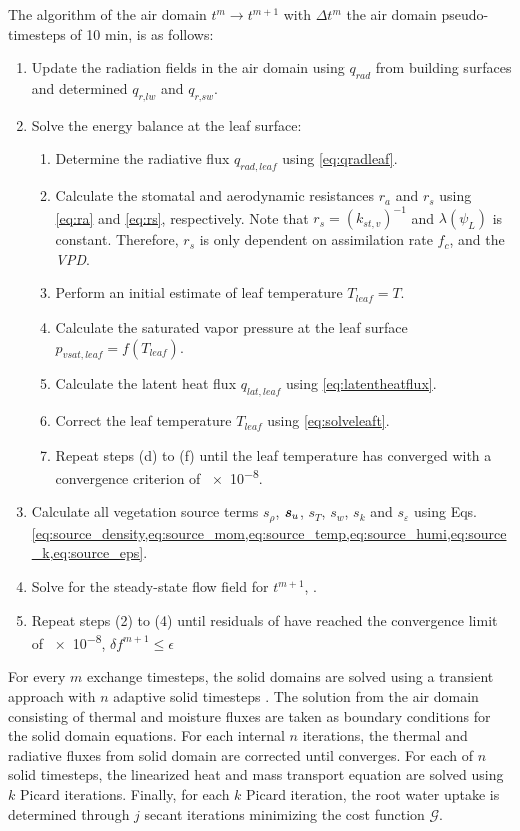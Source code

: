 The algorithm of the air domain $t^{m}\rightarrow t^{m+1}$ with $\Delta t^m$ the air domain pseudo-timesteps of 10 min, is as follows:
\begin{enumerate}
	\item Update the radiation fields in the air domain using $q_{\textit{rad}}$ from building surfaces and determined $q_{\textit{r,lw}}$ and $q_{\textit{r,sw}}$.
	\item Solve the energy balance at the leaf surface:
	\begin{enumerate}
		\item Determine the radiative flux $q_{\mathit{rad,leaf}}$ using \cref{eq:qradleaf}.
		\item Calculate the stomatal and aerodynamic resistances $r_a$ and $r_s$ using \cref{eq:ra} and \cref{eq:rs}, respectively. Note that $r_s = \left(k_{st,v}\right)^{-1}$ and $\lambda(\psi_L)$ is constant. Therefore, $r_s$ is only dependent on assimilation rate $f_c$, and the \textit{VPD}.
		\item Perform an initial estimate of leaf temperature $T_{\mathit{leaf}}=T$.
		\item Calculate the saturated vapor pressure at the leaf surface $p_{\mathit{vsat,leaf}}=f(T_{\mathit{leaf}})$.
		\item Calculate the latent heat flux $q_{\mathit{lat,leaf}}$ using \cref{eq:latentheatflux}. 
		\item Correct the leaf temperature $T_{\mathit{leaf}}$ using \cref{eq:solveleaft}.
		\item Repeat steps (d) to (f) until the leaf temperature has converged with a convergence criterion of \num{e-8}.
	\end{enumerate}
	\item Calculate all vegetation source terms $s_\rho$, $\textbf{\textit{s}}_u$, $s_T$, $s_w$, $s_k$ and $s_{\varepsilon}$ using Eqs. \cref{eq:source_density,eq:source_mom,eq:source_temp,eq:source_humi,eq:source_k,eq:source_eps}.
	\item Solve for the steady-state flow field for $t^{m+1}$, .
	\item Repeat steps (2) to (4) until residuals of  have reached the convergence limit of \num{e-8}, $\delta f^{m+1} \le \epsilon$
\end{enumerate}

For every $m$ exchange timesteps, the solid domains are solved using a transient approach with $n$ adaptive solid timesteps \citep{Kubilay2018,Janssen2002}. The solution from the air domain consisting of thermal and moisture fluxes are taken as boundary conditions for the solid domain equations. For each internal $n$ iterations, the thermal and radiative fluxes from solid domain are corrected until converges. For each of $n$ solid timesteps, the linearized heat and mass transport equation are solved using $k$ Picard iterations. Finally, for each $k$ Picard iteration, the root water uptake is determined through $j$ secant iterations minimizing the cost function $\mathcal{G}$.

